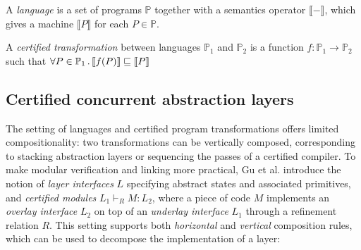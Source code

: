 \begin{definition} \label{def:certified-trans}
A \emph{language} is a set of programs $\mathbb{P}$
together with a semantics operator $\llbracket - \rrbracket$,
which gives a machine $\llbracket P \rrbracket$ for each $P \in \mathbb{P}$.

A \emph{certified transformation} between languages $\mathbb{P}_1$ and $\mathbb{P}_2$
is a function $f : \mathbb{P}_1 \rightarrow \mathbb{P}_2$ such that
$\forall P \in \mathbb{P}_1 \,.\,
\llbracket f(P) \rrbracket \refines \llbracket P \rrbracket$
\end{definition}

\subsection{Certified concurrent abstraction layers}
The setting of languages and certified program transformations
offers limited compositionality:
two transformations can be vertically composed,
corresponding to stacking abstraction layers
or sequencing the passes of a certified compiler.
To make modular verification and linking more practical, Gu et
al. \cite{dscal15} introduce the notion of \emph{layer interfaces} $L$
specifying abstract states and associated primitives,
and \emph{certified modules} $L_1 \vdash_R M : L_2$,
where a piece of code $M$
implements an \emph{overlay interface} $L_2$ on top of an
\emph{underlay interface} $L_1$ through a refinement relation $R$.
This setting supports both \emph{horizontal} and \emph{vertical} composition rules,
which can be used to decompose the implementation of a layer:

\vspace{-5pt}
{\small
\begin{mathpar}
\end{mathpar}
\vspace{-5pt}
\begin{mathpar}
\end{mathpar}
\vspace{-5pt}
}%

